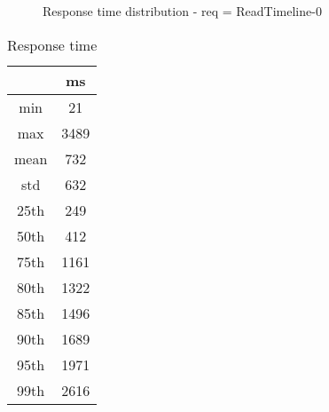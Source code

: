 \begin{minipage}{0.75\linewidth}
\begin{figure}[h]
\begin{adjustbox}{max width=1.0\linewidth, keepaspectratio}
  \end{adjustbox}
  \caption{Response time distribution - req = ReadTimeline-0}
\end{figure}
\end{minipage}\hfill\begin{minipage}{0.18\linewidth}
\begin{table}[h]
\begin{tabular}{|cc|}
\hline
\textbf{} & \textbf{ms}\\ \hline
 \Xhline{0.005\arrayrulewidth}
min & 21\\
 \Xhline{0.005\arrayrulewidth}
max & 3489\\
 \Xhline{0.005\arrayrulewidth}
mean & 732\\
 \Xhline{0.005\arrayrulewidth}
std & 632\\
\hline
\hline
 \Xhline{0.005\arrayrulewidth}
25th & 249\\
 \Xhline{0.005\arrayrulewidth}
50th & 412\\
 \Xhline{0.005\arrayrulewidth}
75th & 1161\\
 \Xhline{0.005\arrayrulewidth}
80th & 1322\\
 \Xhline{0.005\arrayrulewidth}
85th & 1496\\
 \Xhline{0.005\arrayrulewidth}
90th & 1689\\
 \Xhline{0.005\arrayrulewidth}
95th & 1971\\
 \Xhline{0.005\arrayrulewidth}
99th & 2616\\
\hline
\end{tabular}
\caption{Response time}
\end{table}
\end{minipage}\hfill